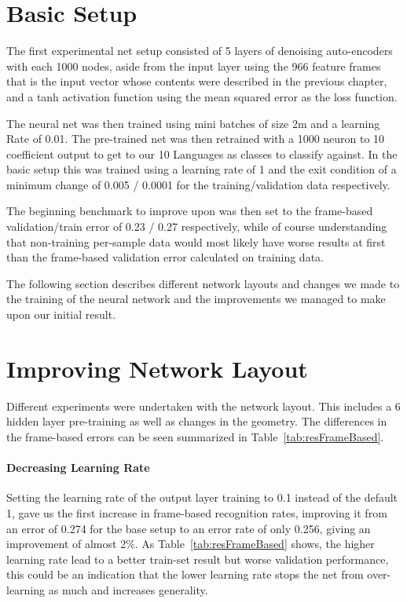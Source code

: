 \section{Basic Setup}
\label{sec:LIDNetwork:Basic}

The first experimental net setup consisted of 5 layers of denoising auto-encoders with each 1000 nodes, aside from the input layer using the 966 feature frames that is the input vector whose contents were described in the previous chapter, and a tanh activation function using the mean squared error as the loss function. 

The neural net was then trained using mini batches of size 2m and a learning Rate of 0.01. The pre-trained net was then retrained with a 1000 neuron to 10 coefficient output to get to our 10 Languages as classes to classify against. In the basic setup this was trained using a learning rate of 1 and the exit condition of a minimum change of 0.005 / 0.0001 for the training/validation data respectively.

The beginning benchmark to improve upon was then set to the frame-based validation/train error of 0.23 / 0.27 respectively, while of course understanding that non-training per-sample data would most likely have worse results at first than the frame-based validation error calculated on training data.

The following section describes different network layouts and changes we made to the training of the neural network and the improvements we managed to make upon our initial result.

\section{Improving Network Layout}
\label{sec:LIDNetwork:Layout}

Different experiments were undertaken with the network layout. This includes a 6 hidden layer pre-training as well as changes in the geometry. The differences in the frame-based errors can be seen summarized in Table~\ref{tab:resFrameBased}. 

\paragraph{Decreasing Learning Rate} Setting the learning rate of the output layer training to 0.1 instead of the default 1, gave us the first increase in frame-based recognition rates, improving it from an error of 0.274 for the base setup to an error rate of only 0.256, giving an improvement of almost 2\%. As Table~\ref{tab:resFrameBased} shows, the higher learning rate lead to a better train-set result but worse validation performance, this could be an indication that the lower learning rate stops the net from over-learning as much and increases generality.

